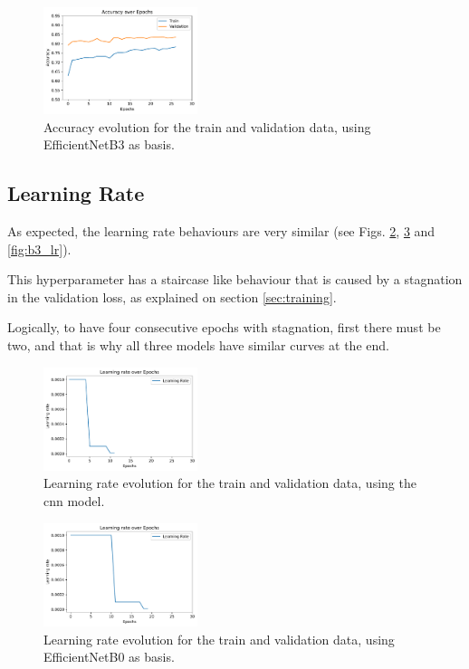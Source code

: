 \documentclass[conference]{IEEEtran}
\begin{document}
\begin{figure}[htp]
    \centering
    \includegraphics[width=0.4\textwidth]{imgs/EfficientNetB3_accu.pdf}
    \caption{Accuracy evolution for the train and validation data, using EfficientNetB3 as basis.}
    \label{fig:b3_accu}
\end{figure}



\subsection{Learning Rate}

As expected, the learning rate behaviours are very similar (see Figs. \ref{fig:cnn_lr}, \ref{fig:b0_lr} and \ref{fig:b3_lr}). 

This hyperparameter has a staircase like behaviour that is caused by a stagnation in the validation loss, as explained on section \ref{sec:training}. 

Logically, to have four consecutive epochs with stagnation, first there must be two, and that is why all three models have similar curves at the end.

\begin{figure}[htp]
    \centering
    \includegraphics[width=0.4\textwidth]{imgs/cnn_lr.pdf}
    \caption{Learning rate evolution for the train and validation data, using the \gls{cnn} model.}
    \label{fig:cnn_lr}
\end{figure}

\begin{figure}[htp]
    \centering
    \includegraphics[width=0.4\textwidth]{imgs/EfficientNetB0_lr.pdf}
    \caption{Learning rate evolution for the train and validation data, using EfficientNetB0 as basis.}
    \label{fig:b0_lr}
\end{figure}
\end{document}
